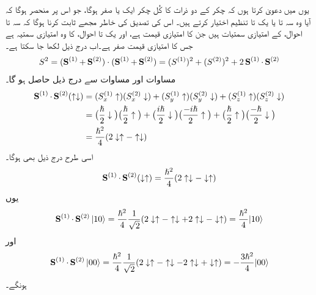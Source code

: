  یوں میں دعویٰ کرتا ہوں کہ  چکر کے دو ذرات کا کُل چکر ایک  یا صفر  ہوگا، جو اس پر منحصر ہوگا کہ آیا وہ سہ تا یا یک تا تنظیم اختیار کرتے ہیں۔ اس کی تصدیق کی خاطر مجھے ثابت کرنا ہوگا کہ سہ تا احوال،  کے امتیازی سمتیات ہیں جن کا امتیازی قیمت  ہے، اور یک تا احوال،  کا وہ امتیازی سمتیہ ہے جس کا امتیازی قیمت صفر ہے۔اب درج ذیل لکھا جا سکتا ہے۔
\begin{align}\label{مساوات_تین_ابعادی_مربع_ایس_سادہ}
S^2 = (\operatorname{\mathbf{S}}^{(1)} + \operatorname{\mathbf{S}}^{(2)}) \cdot (\operatorname{\mathbf{S}}^{(1)} + \operatorname{\mathbf{S}}^{(2)}) = (S^{(1)})^2 + (S^{(2)})^2 + 2 \operatorname{\mathbf{S}}^{(1)} \cdot \operatorname{\mathbf{S}}^{(2)}
\end{align}
مساوات  اور مساوات  سے درج ذیل حاصل ہو گا۔
\begin{align*}
\operatorname{\mathbf{S}}^{(1)} \cdot \operatorname{\mathbf{S}}^{(2)} (\uparrow \downarrow) &= (S_x^{(1)} \uparrow) (S_x^{(2)} \downarrow) + (S_y^{(1)} \uparrow) (S_y^{(2)} \downarrow) + (S_z^{(1)} \uparrow) (S_z^{(2)} \downarrow) \\
&= \big ( \frac{\hslash}{2} \downarrow \big ) \big ( \frac{\hslash}{2} \uparrow \big ) + \big ( \frac{i \hslash}{2} \downarrow \big ) \big ( \frac{- i \hslash}{2} \uparrow \big ) + \big ( \frac{\hslash}{2} \uparrow \big ) \big ( \frac{- \hslash}{2} \downarrow \big ) \\
&= \frac{\hslash^2}{4} (2 \downarrow \uparrow - \uparrow \downarrow)
\end{align*}
اسی طرح درج ذیل بھی ہوگا۔
\begin{align*}
\operatorname{\mathbf{S}}^{(1)} \cdot \operatorname{\mathbf{S}}^{(2)} (\downarrow \uparrow) = \frac{\hslash^2}{4} (2 \uparrow \downarrow - \downarrow \uparrow)
\end{align*}
یوں
\begin{align}
\operatorname{\mathbf{S}}^{(1)} \cdot \operatorname{\mathbf{S}}^{(2)} | 1 0 \rangle = \frac{\hslash^2}{4} \frac{1}{\sqrt{2}} (2 \downarrow \uparrow - \uparrow \downarrow + 2 \uparrow \downarrow - \downarrow \uparrow) = \frac{\hslash^2}{4} | 1 0 \rangle
\end{align}
اور
\begin{align}
\operatorname{\mathbf{S}}^{(1)} \cdot \operatorname{\mathbf{S}}^{(2)} | 0 0 \rangle = \frac{\hslash^2}{4} \frac{1}{\sqrt{2}} (2 \downarrow \uparrow - \uparrow \downarrow - 2 \uparrow \downarrow + \downarrow \uparrow) = -\frac{3\hslash^2}{4} | 0 0 \rangle
\end{align}
ہونگے۔

